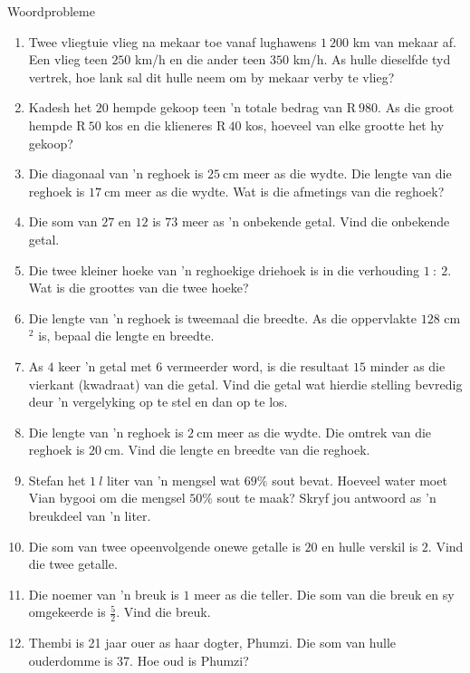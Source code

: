 \begin{exercises}{Woordprobleme}
{
\begin{enumerate}[noitemsep, label=\textbf{\arabic*}. ] 
\item Twee vliegtuie vlieg na mekaar toe vanaf lughawens $1~200$ km van mekaar af. Een vlieg teen $250$ km/h en die ander teen $350$ km/h. As hulle dieselfde tyd vertrek, hoe lank sal dit hulle neem om by mekaar verby te vlieg?
\item Kadesh het $20$ hempde gekoop teen 'n totale bedrag van R$~980$. As die groot hempde R$~50$ kos en die klieneres R$~40$ kos, hoeveel van elke grootte het hy gekoop?
\item Die diagonaal van ’n reghoek is $25~$cm meer as die wydte. Die lengte van die reghoek is $17~$cm meer as die wydte. Wat is die afmetings van die reghoek?  
\item Die som van $27$ en $12$ is $73$ meer as ’n onbekende getal. Vind die onbekende getal.
\item Die twee kleiner hoeke van ’n reghoekige driehoek is in die verhouding $1~:~2$. Wat is die groottes van die
twee hoeke?
\item Die lengte van 'n reghoek is tweemaal die breedte. As die oppervlakte $128$ cm$^{2}$ is, bepaal die lengte en breedte.       
\item As $4$ keer ’n getal met $6$ vermeerder word, is die resultaat $15$ minder as die vierkant (kwadraat) van die
getal. Vind die getal wat hierdie stelling bevredig deur ’n vergelyking op te stel en dan op te los.
\item Die lengte van ’n reghoek is $2~$cm meer as die wydte. Die omtrek van die reghoek is  $20~$cm. Vind die lengte en breedte van die reghoek.
\item Stefan het $1~l$ liter van ’n mengsel wat $69\%$ sout bevat. Hoeveel water moet Vian bygooi om die mengsel $50\%$ sout te maak? Skryf jou antwoord as ’n breukdeel van ’n liter.
\item Die som van twee opeenvolgende onewe getalle is $20$ en hulle verskil is $2$. Vind die twee getalle.
\item Die noemer van 'n breuk is $1$ meer as die teller. Die som van die breuk en sy omgekeerde is $\frac{5}{2}$. Vind die breuk.
\item Thembi is 21 jaar ouer as haar dogter, Phumzi. Die som van hulle ouderdomme is 37. Hoe oud is Phumzi?

\end{enumerate}}
\end{exercises}
